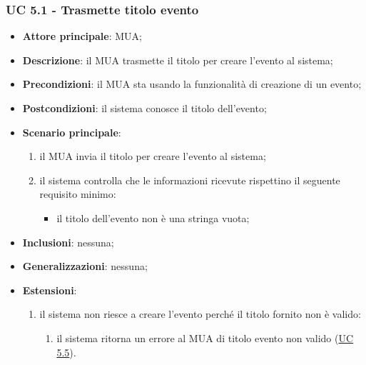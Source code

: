 \subsubsection{UC 5.1 - Trasmette titolo evento} \label{sec:UC5.1}
    \begin{itemize}
        \item \textbf{Attore principale}: MUA;
        \item \textbf{Descrizione}: il MUA trasmette il titolo per creare l'evento al sistema;
        \item \textbf{Precondizioni}: il MUA sta usando la funzionalità di creazione di un evento;
        \item \textbf{Postcondizioni}: il sistema conosce il titolo dell'evento;
        \item \textbf{Scenario principale}:
            \begin{enumerate}
                \item il MUA invia il titolo per creare l'evento al sistema;
                \item il sistema controlla che le informazioni ricevute rispettino il seguente requisito minimo:
                    \begin{itemize}
                        \item il titolo dell'evento non è una stringa vuota;
                    \end{itemize}
            \end{enumerate}
        \item \textbf{Inclusioni}: nessuna;
        \item \textbf{Generalizzazioni}: nessuna;
        \item \textbf{Estensioni}:
            \begin{enumerate}[label=\alph*.]
                \item il sistema non riesce a creare l'evento perché il titolo fornito non è valido:
                \begin{enumerate}[label=\arabic*.]
                    \item il sistema ritorna un errore al MUA di titolo evento non valido (\hyperref[sec:UC5.5]{UC 5.5}).
                \end{enumerate}
            \end{enumerate}
    \end{itemize}



